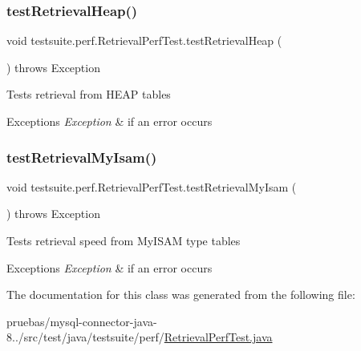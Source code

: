 \subsubsection{\texorpdfstring{test\+Retrieval\+Heap()}{testRetrievalHeap()}}
{\footnotesize\ttfamily void testsuite.\+perf.\+Retrieval\+Perf\+Test.\+test\+Retrieval\+Heap (\begin{DoxyParamCaption}{ }\end{DoxyParamCaption}) throws Exception}

Tests retrieval from H\+E\+AP tables


\begin{DoxyExceptions}{Exceptions}
{\em Exception} & if an error occurs \\
\hline
\end{DoxyExceptions}
\mbox{\label{classtestsuite_1_1perf_1_1_retrieval_perf_test_a7228eef6533f6ff301ae53d044e25f9e}} 
\subsubsection{\texorpdfstring{test\+Retrieval\+My\+Isam()}{testRetrievalMyIsam()}}
{\footnotesize\ttfamily void testsuite.\+perf.\+Retrieval\+Perf\+Test.\+test\+Retrieval\+My\+Isam (\begin{DoxyParamCaption}{ }\end{DoxyParamCaption}) throws Exception}

Tests retrieval speed from My\+I\+S\+AM type tables


\begin{DoxyExceptions}{Exceptions}
{\em Exception} & if an error occurs \\
\hline
\end{DoxyExceptions}


The documentation for this class was generated from the following file\+:\begin{DoxyCompactItemize}
\item 
pruebas/mysql-\/connector-\/java-\/8../src/test/java/testsuite/perf/\mbox{\hyperlink{_retrieval_perf_test_8java}{Retrieval\+Perf\+Test.\+java}}\end{DoxyCompactItemize}
